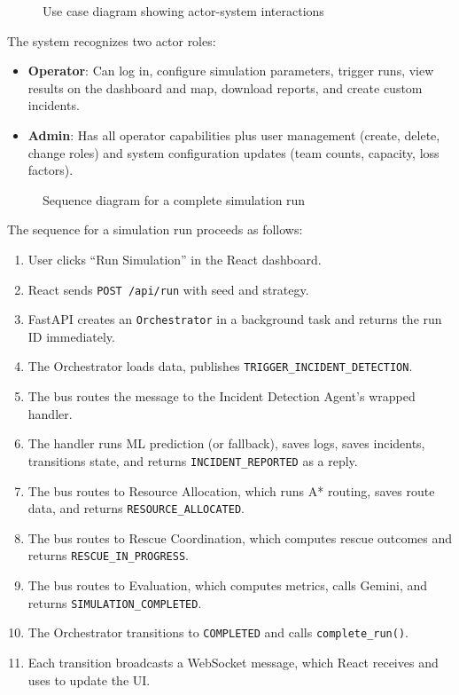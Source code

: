\begin{figure}[H]
\centering
{}
\caption{Use case diagram showing actor-system interactions}
\label{fig:use_case}
\end{figure}

The system recognizes two actor roles:

\begin{itemize}[leftmargin=*]
    \item \textbf{Operator}: Can log in, configure simulation parameters, trigger runs, view results on the dashboard and map, download reports, and create custom incidents.
    \item \textbf{Admin}: Has all operator capabilities plus user management (create, delete, change roles) and system configuration updates (team counts, capacity, loss factors).
\end{itemize}

\begin{figure}[H]
\centering
{}
\caption{Sequence diagram for a complete simulation run}
\label{fig:sequence_diagram}
\end{figure}

The sequence for a simulation run proceeds as follows:

\begin{enumerate}[leftmargin=*]
    \item User clicks ``Run Simulation'' in the React dashboard.
    \item React sends \texttt{POST /api/run} with seed and strategy.
    \item FastAPI creates an \texttt{Orchestrator} in a background task and returns the run ID immediately.
    \item The Orchestrator loads data, publishes \texttt{TRIGGER\_INCIDENT\_DETECTION}.
    \item The bus routes the message to the Incident Detection Agent's wrapped handler.
    \item The handler runs ML prediction (or fallback), saves logs, saves incidents, transitions state, and returns \texttt{INCIDENT\_REPORTED} as a reply.
    \item The bus routes to Resource Allocation, which runs A* routing, saves route data, and returns \texttt{RESOURCE\_ALLOCATED}.
    \item The bus routes to Rescue Coordination, which computes rescue outcomes and returns \texttt{RESCUE\_IN\_PROGRESS}.
    \item The bus routes to Evaluation, which computes metrics, calls Gemini, and returns \texttt{SIMULATION\_COMPLETED}.
    \item The Orchestrator transitions to \texttt{COMPLETED} and calls \texttt{complete\_run()}.
    \item Each transition broadcasts a WebSocket message, which React receives and uses to update the UI.
\end{enumerate}

